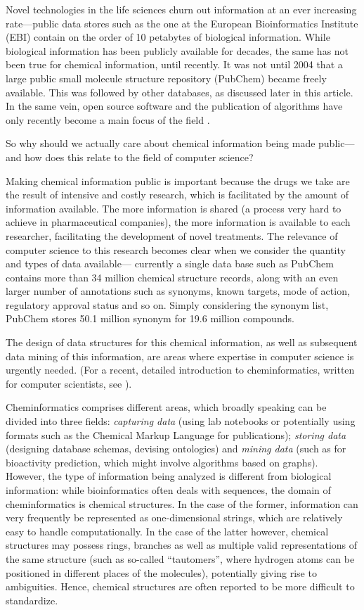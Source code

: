 \documentclass{sig-alternate}
\begin{document}
Novel technologies in the life sciences churn out information at an
ever increasing rate---public data stores such as the one at the
European Bioinformatics Institute (EBI) contain on the order of 10
petabytes of biological information.  While biological
information has been publicly available for decades, the same has not
been true for chemical information, until recently. It was not until
2004 that a large public small molecule structure repository (PubChem)
became freely available. This was followed by other databases, as
discussed later in this article. In the same vein, open source
software and the publication of algorithms have only recently become a
main focus of the field \cite{faulon2010}.

So why should we actually care about chemical information being made
public---and how does this relate to the field of computer science?

Making chemical information public is important because the drugs we
take are the result of intensive and costly research, which is
facilitated by the amount of information available. The more
information is shared (a process very hard to achieve in
pharmaceutical companies), the more information is available to each
researcher, facilitating the development of novel treatments. The
relevance of computer science to this research becomes clear when we
consider the quantity and types of data available--- currently a
single data base such as PubChem contains more than 34 million
chemical structure records, along with an even larger number of
annotations such as synonyms, known targets, mode of action,
regulatory approval status and so on.  Simply considering the synonym
list, PubChem stores 50.1 million synonym for 19.6 million compounds.

The design of data structures for this chemical information, as well
as subsequent data mining of this information, are areas where
expertise in computer science is urgently needed. (For a recent,
detailed introduction to cheminformatics, written for computer
scientists, see \cite{brown2009}).

Cheminformatics comprises different areas, which broadly speaking can
be divided into three fields: \emph{capturing data} (using lab
notebooks or potentially using formats such as the Chemical Markup
Language for publications); \emph{storing data} (designing database
schemas, devising ontologies) and \emph{mining data} (such as for
bioactivity prediction, which might involve algorithms based on
graphs).  However, the type of information being analyzed is different
from biological information: while bioinformatics often deals with
sequences, the domain of cheminformatics is chemical structures. In
the case of the former, information can very frequently be represented
as one-dimensional strings, which are relatively easy to handle
computationally. In the case of the latter however, chemical
structures may possess rings, branches as well as multiple valid
representations of the same structure (such as so-called
``tautomers'', where hydrogen atoms can be positioned in different
places of the molecules), potentially giving rise to
ambiguities. Hence, chemical structures are often reported to be more
difficult to standardize.
\end{document}
